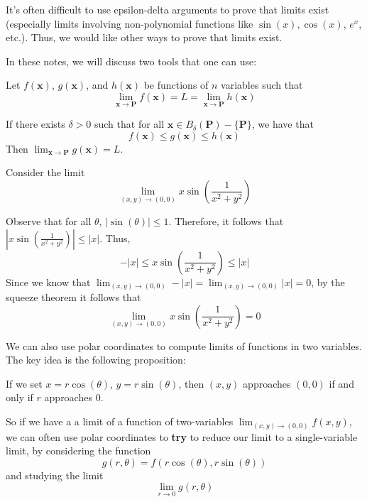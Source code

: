     It's often difficult to use epsilon-delta arguments to prove that limits exist (especially limits involving non-polynomial functions like $\sin(x), \cos(x)$, $e^x$, etc.).  Thus, we would like other ways to prove that limits exist.

    In these notes, we will discuss two tools that one can use:

       
    \begin{theorem}
    Let $f(\bm{x})$, $g(\bm{x})$, and $h(\bm{x})$ be functions of $n$ variables such that $$\lim_{\bm{x} \to \bm{P}}f(\bm{x}) = L = \lim_{\bm{x} \to \bm{P}}h(\bm{x})$$
    
    If there exists $\delta > 0$ such that for all $\bm{x} \in B_\delta(\bm{P}) - \{\bm{P}\}$, we have that $$f(\bm{x}) \leq g(\bm{x}) \leq h(\bm{x})$$ 
    Then $\lim_{\bm{x} \to \bm{P}}g(\bm{x}) = L$.
    \end{theorem}

    

    
    \begin{example}
    Consider the limit $$\lim_{(x,y) \to (0,0)} x\sin(\frac{1}{x^2 + y^2})$$ 

    Observe that for all $\theta$,  $|\sin(\theta)| \leq 1$.  Therefore, it follows that $|x\sin(\frac{1}{x^2 + y^2})| \leq |x|$.  Thus, 
    $$-|x| \leq x\sin(\frac{1}{x^2 + y^2}) \leq |x|$$
    Since we know that $\lim_{(x,y) \to (0,0)} -|x| = \lim_{(x,y) \to (0,0)} |x| = 0$, by the squeeze theorem it follows that $$\lim_{(x,y) \to (0,0)} x\sin(\frac{1}{x^2 + y^2}) = 0$$ 
    \end{example}
    

    We can also use polar coordinates to compute limits of functions in two variables.  The key idea is the following proposition:

\begin{proposition}

If we set $x = r\cos(\theta)$, $y  = r\sin(\theta)$, then $(x,y)$ approaches $(0,0)$ if and only if $r$ approaches $0$.

\end{proposition}

So if we have a a limit of a function of two-variables $\lim_{(x,y) \to (0,0)} f(x,y)$, we can often use polar coordinates to \textbf{try} to reduce our limit to a single-variable limit, by considering the function $$g(r,\theta) = f(r\cos(\theta), r\sin(\theta))$$ and studying the limit 
$$\lim_{r \to 0} g(r,\theta)$$

